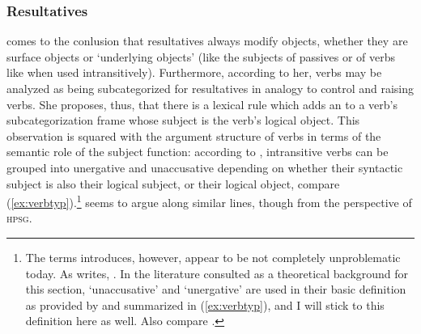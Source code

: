 
\subsubsection{Resultatives}
\label{subsubsec:res}

\citet{simpson1983} comes to the conlusion that resultatives always modify
objects, whether they are surface objects or `underlying objects' (like the
subjects of passives or of verbs like  when used intransitively).
Furthermore, according to her, verbs may be analyzed as being subcategorized
for resultatives in analogy to control and raising verbs. She proposes, thus,
that there is a lexical rule which adds an \XCompl{} to a verb's
subcategorization frame whose subject is the verb's logical object. This
observation is squared with the argument structure of verbs in terms of the
semantic role of the subject function: according to \citet{perlmutter1978},
intransitive verbs can be grouped into unergative and unaccusative depending on
whether their syntactic subject is also their logical subject, or their logical
object, compare (\ref{ex:verbtyp}).\footnote{The terms \citet{perlmutter1978}
introduces, however, appear to be not completely unproblematic today. As
\citet{dixon2010b} writes, . In the literature consulted as
a theoretical background for this section, `unaccusative' and `unergative' are
used in their basic definition as provided by \citet{perlmutter1978} and
summarized in (\ref{ex:verbtyp}), and I will stick to this definition here as
well. Also compare \citet[334--336]{bresnan2016}.} \citet{mueller2002} seems to
argue along similar lines, though from the perspective of \textsc{hpsg}.

